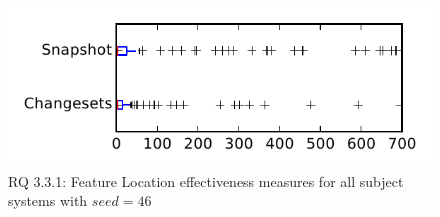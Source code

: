 
\begin{figure}
\centering
\includegraphics[height=0.4\textheight]{figures/flt_seed/rq1_tiny_46}
\caption{RQ 3.3.1: Feature Location effectiveness measures for all subject systems with $seed=46$}
\label{fig:flt_seed:rq1:tiny}
\end{figure}
